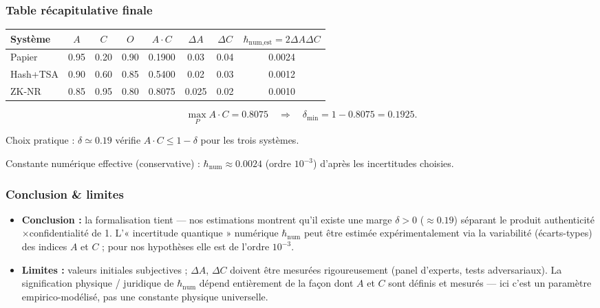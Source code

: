 \documentclass[12pt,a4paper]{article}
\begin{document}
	 \subsubsection*{Table récapitulative finale}
	 \begin{table}[h]
	 	\centering
	 	\begin{tabular}{lccccccc}
	 		\hline
	 		\textbf{Système} & $A$ & $C$ & $O$ & $A \cdot C$ & $\Delta A$ & $\Delta C$ & $\hbar_{\text{num,est}} = 2 \Delta A \Delta C$ \\
	 		\hline
	 		Papier & 0.95 & 0.20 & 0.90 & 0.1900 & 0.03 & 0.04 & 0.0024 \\
	 		Hash+TSA & 0.90 & 0.60 & 0.85 & 0.5400 & 0.02 & 0.03 & 0.0012 \\
	 		ZK-NR & 0.85 & 0.95 & 0.80 & 0.8075 & 0.025 & 0.02 & 0.0010 \\
	 		\hline
	 	\end{tabular}
	 \end{table}
	 
	 \[
	 \max_P A \cdot C = 0.8075 \quad \Rightarrow \quad \delta_{\min} = 1 - 0.8075 = 0.1925.
	 \]
	 
	 Choix pratique : $\delta \simeq 0.19$ vérifie $A \cdot C \leq 1 - \delta$ pour les trois systèmes.
	 
	 Constante numérique effective (conservative) : $\hbar_{\text{num}} \approx 0.0024$ (ordre $10^{-3}$) d'après les incertitudes choisies.
	 
	 \subsubsection*{Conclusion \& limites}
	 \begin{itemize}
	 	\item \textbf{Conclusion :} la formalisation tient — nos estimations montrent qu'il existe une marge $\delta > 0$ ($\approx 0.19$) séparant le produit authenticité$\times$confidentialité de 1. L'« incertitude quantique » numérique $\hbar_{\text{num}}$ peut être estimée expérimentalement via la variabilité (écarts-types) des indices $A$ et $C$ ; pour nos hypothèses elle est de l'ordre $10^{-3}$.
	 	
	 	\item \textbf{Limites :} valeurs initiales subjectives ; $\Delta A$, $\Delta C$ doivent être mesurées rigoureusement (panel d'experts, tests adversariaux). La signification physique / juridique de $\hbar_{\text{num}}$ dépend entièrement de la façon dont $A$ et $C$ sont définis et mesurés — ici c'est un paramètre empirico-modélisé, pas une constante physique universelle.
	 \end{itemize}
\end{document}
